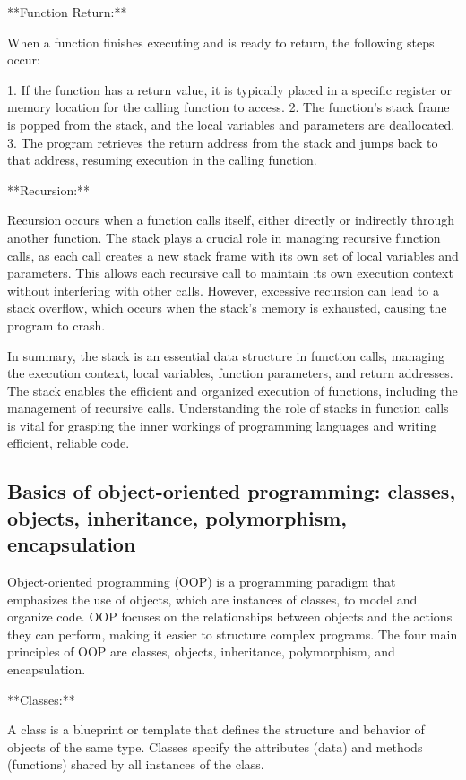 \documentclass{article}
\begin{document}
**Function Return:**

When a function finishes executing and is ready to return, the following steps occur:

1. If the function has a return value, it is typically placed in a specific register or memory location for the calling function to access.
2. The function's stack frame is popped from the stack, and the local variables and parameters are deallocated.
3. The program retrieves the return address from the stack and jumps back to that address, resuming execution in the calling function.

**Recursion:**

Recursion occurs when a function calls itself, either directly or indirectly through another function. The stack plays a crucial role in managing recursive function calls, as each call creates a new stack frame with its own set of local variables and parameters. This allows each recursive call to maintain its own execution context without interfering with other calls. However, excessive recursion can lead to a stack overflow, which occurs when the stack's memory is exhausted, causing the program to crash.

In summary, the stack is an essential data structure in function calls, managing the execution context, local variables, function parameters, and return addresses. The stack enables the efficient and organized execution of functions, including the management of recursive calls. Understanding the role of stacks in function calls is vital for grasping the inner workings of programming languages and writing efficient, reliable code.


\subsection{Basics of object-oriented programming: classes, objects, inheritance, polymorphism, encapsulation}

Object-oriented programming (OOP) is a programming paradigm that emphasizes the use of objects, which are instances of classes, to model and organize code. OOP focuses on the relationships between objects and the actions they can perform, making it easier to structure complex programs. The four main principles of OOP are classes, objects, inheritance, polymorphism, and encapsulation.

**Classes:**

A class is a blueprint or template that defines the structure and behavior of objects of the same type. Classes specify the attributes (data) and methods (functions) shared by all instances of the class.
\end{document}
